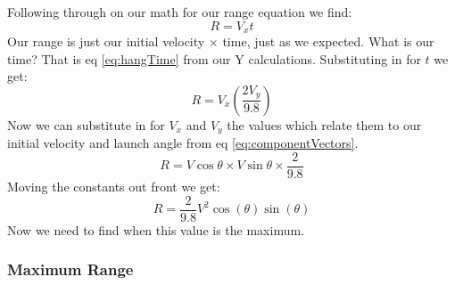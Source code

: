 \documentclass[10pt,a4paper]{article}
\begin{document}
		Following through on our math for our range equation we find:
		\[ R = V_xt \]
		Our range is just our initial velocity $\times$ time, just as we expected.
		What is our time?
		That is eq \ref{eq:hangTime} from our Y calculations.
		Substituting in for $t$ we get:
		\[ R = V_x\left(\frac{2V_y}{9.8}\right) \]
		Now we can substitute in for $V_x$ and $V_y$ the values which relate them to our initial velocity and launch angle from eq \ref{eq:componentVectors}.
		\[ R = V\cos\theta \times V\sin\theta \times \frac{2}{9.8} \]
		Moving the constants out front we get:
		\begin{equation}
			R = \frac{2}{9.8} V^2 \cos(\theta) \sin(\theta)
			\label{eq:range}
		\end{equation}
		Now we need to find when this value is the maximum.
		
	\subsubsection{Maximum Range}
		
\end{document}

